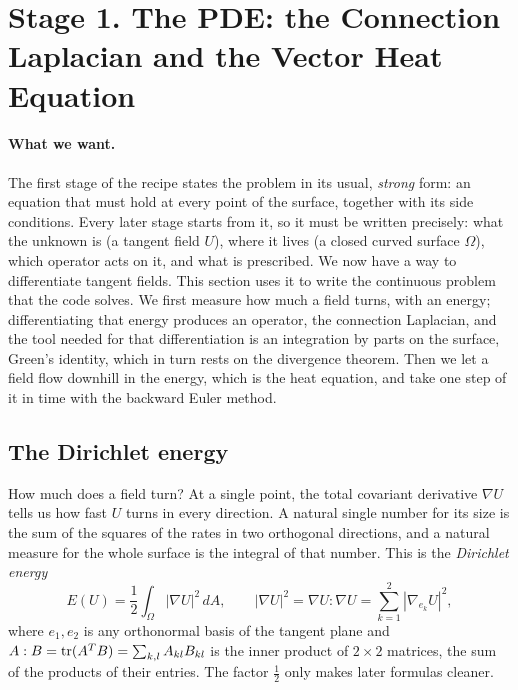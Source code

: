\section{Stage 1. The PDE: the Connection Laplacian and the Vector Heat Equation}
\label{section:pde}

\paragraph{What we want.} The first stage of the recipe states the problem in its usual, \emph{strong} form: an equation that must hold at every point of the surface, together with its side conditions. Every later stage starts from it, so it must be written precisely: what the unknown is (a tangent field $U$), where it lives (a closed curved surface $\Omega$), which operator acts on it, and what is prescribed. We now have a way to differentiate tangent fields. This section uses it to write the continuous problem that the code solves. We first measure how much a field turns, with an energy; differentiating that energy produces an operator, the connection Laplacian, and the tool needed for that differentiation is an integration by parts on the surface, Green's identity, which in turn rests on the divergence theorem. Then we let a field flow downhill in the energy, which is the heat equation, and take one step of it in time with the backward Euler method.

\subsection{The Dirichlet energy}

How much does a field turn? At a single point, the total covariant derivative $\nabla U$ tells us how fast $U$ turns in every direction. A natural single number for its size is the sum of the squares of the rates in two orthogonal directions, and a natural measure for the whole surface is the integral of that number. This is the \emph{Dirichlet energy}
\begin{equation}
\label{eqn:dirichlet}
E(U) = \frac12 \int_\Omega |\nabla U|^2\, dA, \qquad |\nabla U|^2 = \nabla U : \nabla U = \sum_{k=1}^2 |\nabla_{e_k} U|^2,
\end{equation}
where $e_1, e_2$ is any orthonormal basis of the tangent plane and $A : B = \operatorname{tr}(A^T B) = \sum_{k,l} A_{kl} B_{kl}$ is the inner product of $2 \times 2$ matrices, the sum of the products of their entries. The factor $\frac12$ only makes later formulas cleaner.

